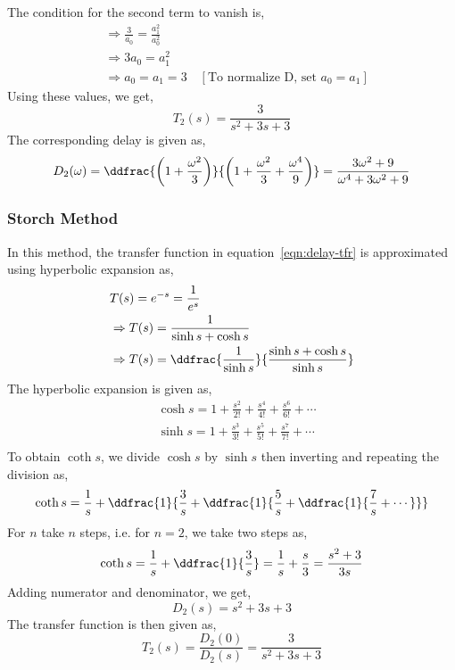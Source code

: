 The condition for the second term to vanish is,
\begin{equation*}
   \begin{aligned}
    &\Rightarrow \frac{3}{a_0}=\frac{a_1^2}{a_0^2}\\
    &\Rightarrow 3a_0=a_1^2\\
    &\Rightarrow a_0=a_1=3 \quad [\text{To normalize D, set }a_0=a_1] 
   \end{aligned}
\end{equation*}
Using these values, we get,
\begin{equation*}
    T_2(s)=\frac{3}{s^2+3s+3}
\end{equation*}
The corresponding delay is given as,
\begin{equation*}
    D_2(\omega)=\ddfrac{\left(1+\frac{\omega^2}{3}\right)}{\left(1+\frac{\omega^2}{3}+\frac{\omega^4}{9}\right)}=\frac{3\omega^2+9}{\omega^4+3\omega^2+9}
\end{equation*}
\subsubsection*{Storch Method}
In this method, the transfer function in equation~\ref{eqn:delay-tfr} is approximated using hyperbolic expansion as,
\begin{equation*}
    \begin{aligned}
        &T(s)=e^{-s}=\frac{1}{e^s}\\
        &\Rightarrow T(s)=\frac{1}{\sinh s +\cosh s}\\
        &\Rightarrow T(s)=\ddfrac{\frac{1}{\sinh s}}{\frac{\sinh s + \cosh s}{\sinh s}}\\
    \end{aligned}
\end{equation*}
The hyperbolic expansion is given as,
\begin{equation*}
    \begin{aligned}
        &\cosh s =1+\frac{s^2}{2!}+\frac{s^4}{4!}+\frac{s^6}{6!}+\cdots\\
        &\sinh s =1+\frac{s^3}{3!}+\frac{s^5}{5!}+\frac{s^7}{7!}+\cdots\\
    \end{aligned}
\end{equation*}
To obtain $\coth s$, we divide $\cosh s$ by $\sinh s$ then inverting and repeating the division as,
\begin{equation*}
    \coth s =\frac{1}{s}+\ddfrac{1}{\frac{3}{s}+\ddfrac{1}{\frac{5}{s}+\ddfrac{1}{\frac{7}{s}+\cdots}}}
\end{equation*}
For $n$ take $n$ steps, i.e. for $n=2$, we take two steps as,
\begin{equation*}
    \coth s =\frac{1}{s}+\ddfrac{1}{\frac{3}{s}}=\frac{1}{s}+\frac{s}{3}=\frac{s^2+3}{3s}
\end{equation*}
Adding numerator and denominator, we get,
\begin{equation*}
    D_2(s)=s^2+3s+3
\end{equation*}
The transfer function is then given as,
\begin{equation*}
    T_2(s)=\frac{D_2(0)}{D_2(s)}=\frac{3}{s^2+3s+3}
\end{equation*}